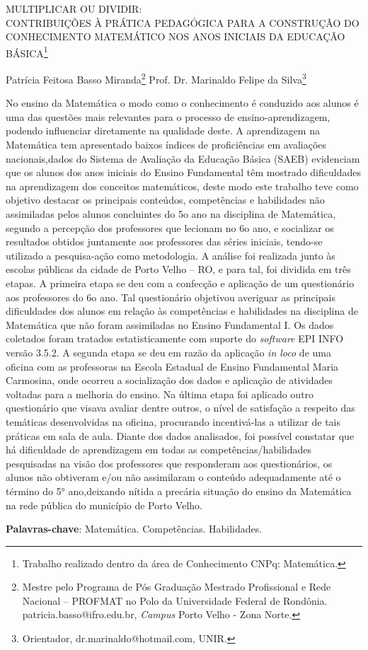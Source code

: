 \documentclass[article,12pt,onesidea,4paper,english,brazil]{abntex2}
\begin{document}
	
	
	\frenchspacing 
	
	\begin{center}
		\LARGE MULTIPLICAR OU DIVIDIR: \\CONTRIBUIÇÕES À PRÁTICA PEDAGÓGICA PARA A CONSTRUÇÃO DO CONHECIMENTO MATEMÁTICO NOS ANOS INICIAIS DA EDUCAÇÃO BÁSICA\footnote{Trabalho realizado dentro da área de Conhecimento CNPq: Matemática.}
		
		\normalsize
		Patrícia Feitosa Basso Miranda\footnote{Mestre pelo Programa de Pós Graduação Mestrado Profissional e Rede Nacional – PROFMAT no Polo da Universidade Federal de Rondônia. patricia.basso@ifro.edu.br, \textit{Campus} Porto Velho - Zona Norte.} 
		Prof. Dr. Marinaldo Felipe da Silva\footnote{Orientador, dr.marinaldo@hotmail.com, UNIR.} 
	\end{center}
	
	\noindent No ensino da Matemática o modo como o conhecimento é conduzido aos alunos é
	uma das questões mais relevantes para o processo de ensino-aprendizagem,
	podendo influenciar diretamente na qualidade deste. A aprendizagem na Matemática
	tem apresentado baixos índices de proficiências em avaliações nacionais,dados do
	Sistema de Avaliação da Educação Básica (SAEB) evidenciam que os alunos dos
	anos iniciais do Ensino Fundamental têm mostrado dificuldades na aprendizagem
	dos conceitos matemáticos, deste modo este trabalho teve como objetivo destacar
	os principais conteúdos, competências e habilidades não assimiladas pelos alunos
	concluintes do 5o ano na disciplina de Matemática, segundo a percepção dos
	professores que lecionam no 6o ano, e socializar os resultados obtidos juntamente
	aos professores das séries iniciais, tendo-se utilizado a pesquisa-ação como
	metodologia. A análise foi realizada junto às escolas públicas da cidade de Porto
	Velho – RO, e para tal, foi dividida em três etapas. A primeira etapa se deu com a
	confecção e aplicação de um questionário aos professores do 6o ano. Tal
	questionário objetivou averiguar as principais dificuldades dos alunos em relação às
	competências e habilidades na disciplina de Matemática que não foram assimiladas
	no Ensino Fundamental I. Os dados coletados foram tratados estatisticamente com
	suporte do \textit{software} EPI INFO versão 3.5.2. A segunda etapa se deu em razão da
	aplicação \textit{in loco} de uma oficina com as professoras na Escola Estadual de Ensino
	Fundamental Maria Carmosina, onde ocorreu a socialização dos dados e aplicação
	de atividades voltadas para a melhoria do ensino. Na última etapa foi aplicado outro
	questionário que visava avaliar dentre outros, o nível de satisfação a respeito das
	temáticas desenvolvidas na oficina, procurando incentivá-las a utilizar de tais
	práticas em sala de aula. Diante dos dados analisados, foi possível constatar que há
	dificuldade de aprendizagem em todas as competências/habilidades pesquisadas na
	visão dos professores que responderam aos questionários, os alunos não obtiveram
	e/ou não assimilaram o conteúdo adequadamente até o término do 5° ano,deixando
	nítida a precária situação do ensino da Matemática na rede pública do município de
	Porto Velho.
	
	\vspace{\onelineskip}
	
	\noindent
	\textbf{Palavras-chave}: Matemática. Competências. Habilidades.
	
\end{document}
